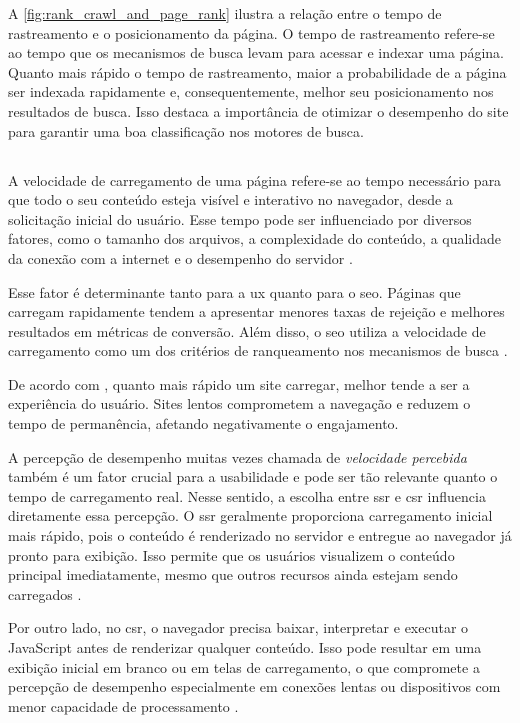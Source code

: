 A \autoref{fig:rank_crawl_and_page_rank} ilustra a relação entre o tempo de rastreamento e o posicionamento da página. O tempo de rastreamento refere-se ao tempo que os mecanismos de busca levam para acessar e indexar uma página. Quanto mais rápido o tempo de rastreamento, maior a probabilidade de a página ser indexada rapidamente e, consequentemente, melhor seu posicionamento nos resultados de busca. Isso destaca a importância de otimizar o desempenho do site para garantir uma boa classificação nos motores de busca.

\subsection{}
\label{sec:velocidade da página}

A velocidade de carregamento de uma página refere-se ao tempo necessário para que todo o seu conteúdo esteja visível e interativo no navegador, desde a solicitação inicial do usuário. Esse tempo pode ser influenciado por diversos fatores, como o tamanho dos arquivos, a complexidade do conteúdo, a qualidade da conexão com a internet e o desempenho do servidor \cite{shopify2024}.

Esse fator é determinante tanto para a \acrshort{ux} quanto para o \acrshort{seo}. Páginas que carregam rapidamente tendem a apresentar menores taxas de rejeição e melhores resultados em métricas de conversão. Além disso, o \acrshort{seo} utiliza a velocidade de carregamento como um dos critérios de ranqueamento nos mecanismos de busca \cite{conor2022}.

De acordo com , quanto mais rápido um site carregar, melhor tende a ser a experiência do usuário. Sites lentos comprometem a navegação e reduzem o tempo de permanência, afetando negativamente o engajamento.

A percepção de desempenho muitas vezes chamada de \emph{velocidade percebida} também é um fator crucial para a usabilidade e pode ser tão relevante quanto o tempo de carregamento real. Nesse sentido, a escolha entre \acrshort{ssr} e \acrshort{csr} influencia diretamente essa percepção. O \acrshort{ssr} geralmente proporciona carregamento inicial mais rápido, pois o conteúdo é renderizado no servidor e entregue ao navegador já pronto para exibição. Isso permite que os usuários visualizem o conteúdo principal imediatamente, mesmo que outros recursos ainda estejam sendo carregados \cite{atori2024}.

Por outro lado, no \acrshort{csr}, o navegador precisa baixar, interpretar e executar o JavaScript antes de renderizar qualquer conteúdo. Isso pode resultar em uma exibição inicial em branco ou em telas de carregamento, o que compromete a percepção de desempenho especialmente em conexões lentas ou dispositivos com menor capacidade de processamento \cite{pixelfree2023}.


